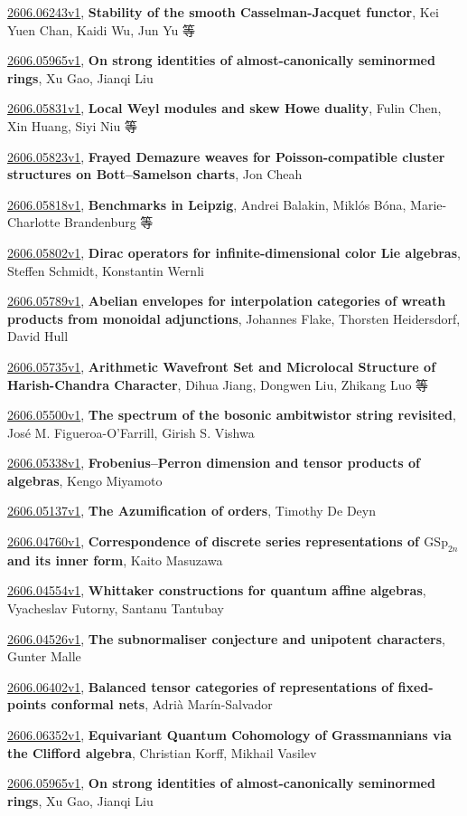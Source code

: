 \documentclass[9pt, a4paper]{article}
\theoremstyle{plain}
\theoremstyle{definition}
\theoremstyle{remark}
\newcommand{\arxiv}[3]{\href{https://arxiv.org/abs/#1}{#1}, \textbf{\textcolor{arxivblue}{#2}}, #3}
\begin{document}
\arxiv{2606.06243v1}{Stability of the smooth Casselman-Jacquet functor}{Kei Yuen Chan, Kaidi Wu, Jun Yu 等}

\arxiv{2606.05965v1}{On strong identities of almost-canonically seminormed rings}{Xu Gao, Jianqi Liu}

\arxiv{2606.05831v1}{Local Weyl modules and skew Howe duality}{Fulin Chen, Xin Huang, Siyi Niu 等}

\arxiv{2606.05823v1}{Frayed Demazure weaves for Poisson-compatible cluster structures on Bott--Samelson charts}{Jon Cheah}

\arxiv{2606.05818v1}{Benchmarks in Leipzig}{Andrei Balakin, Miklós Bóna, Marie-Charlotte Brandenburg 等}

\arxiv{2606.05802v1}{Dirac operators for infinite-dimensional color Lie algebras}{Steffen Schmidt, Konstantin Wernli}

\arxiv{2606.05789v1}{Abelian envelopes for interpolation categories of wreath products from monoidal adjunctions}{Johannes Flake, Thorsten Heidersdorf, David Hull}

\arxiv{2606.05735v1}{Arithmetic Wavefront Set and Microlocal Structure of Harish-Chandra Character}{Dihua Jiang, Dongwen Liu, Zhikang Luo 等}

\arxiv{2606.05500v1}{The spectrum of the bosonic ambitwistor string revisited}{José M. Figueroa-O'Farrill, Girish S. Vishwa}

\arxiv{2606.05338v1}{Frobenius--Perron dimension and tensor products of algebras}{Kengo Miyamoto}

\arxiv{2606.05137v1}{The Azumification of orders}{Timothy De Deyn}

\arxiv{2606.04760v1}{Correspondence of discrete series representations of $\mathrm{GSp}_{2n}$ and its inner form}{Kaito Masuzawa}

\arxiv{2606.04554v1}{Whittaker constructions for quantum affine algebras}{Vyacheslav Futorny, Santanu Tantubay}

\arxiv{2606.04526v1}{The subnormaliser conjecture and unipotent characters}{Gunter Malle}

\arxiv{2606.06402v1}{Balanced tensor categories of representations of fixed-points conformal nets}{Adrià Marín-Salvador}

\arxiv{2606.06352v1}{Equivariant Quantum Cohomology of Grassmannians via the Clifford algebra}{Christian Korff, Mikhail Vasilev}

\arxiv{2606.05965v1}{On strong identities of almost-canonically seminormed rings}{Xu Gao, Jianqi Liu}
\end{document}
